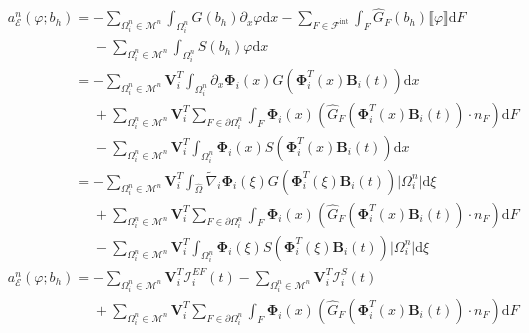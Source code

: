 \documentclass[11pt, a4paper, oneside]{report}
\begin{document}
\begin{equation}
    \begin{aligned}
        &a_\mathcal{E}^n(\varphi; b_h) = -\sum_{\Omega_i^n \in \mathcal{M}^n} \int_{\Omega_i^n} G(b_h) \partial_x \varphi \text{d}x - \sum_{F \in \mathcal{F}^\text{int}} \int_F \widehat{G}_F(b_h) \llbracket \varphi \rrbracket \text{d}F \\
        &\phantom{a_\mathcal{E}^n(\varphi; b_h) = } -\sum_{\Omega_i^n \in \mathcal{M}^n} \int_{\Omega_i^n} S(b_h) \varphi \text{d}x \\
        &\phantom{a_\mathcal{E}^n(\varphi; b_h) } = - \sum_{\Omega_i^n \in \mathcal{M}^n} \bm{V}_i^T \int_{\Omega_i^n} \partial_x \bm{\Phi}_i(x) G \left( \bm{\Phi}_i^T(x) \bm{B}_i(t) \right) \text{d}x \\
        &\phantom{a_\mathcal{E}^n(\varphi; b_h) = } + \sum_{\Omega_i^n \in \mathcal{M}^n} \bm{V}_i^T \sum_{F \in \partial \Omega_i^n} \int_F \bm{\Phi}_i(x) \left( \widehat{G}_F \left( \bm{\Phi}_i^T(x) \bm{B}_i(t) \right) \cdot n_F \right) \text{d}F \\
        &\phantom{a_\mathcal{E}^n(\varphi; b_h) = } - \sum_{\Omega_i^n \in \mathcal{M}^n} \bm{V}_i^T \int_{\Omega_i^n} \bm{\Phi}_i(x) S \left( \bm{\Phi}_i^T(x) \bm{B}_i(t) \right) \text{d}x \\
        &\phantom{a_\mathcal{E}^n(\varphi; b_h) } = - \sum_{\Omega_i^n \in \mathcal{M}^n} \bm{V}_i^T \int_{\widehat{\Omega}} \widetilde{\nabla}_i \bm{\Phi}_i(\xi) G \left( \bm{\Phi}_i^T(\xi) \bm{B}_i(t) \right) \lvert \Omega_i^n \rvert \text{d}\xi \\
        &\phantom{a_\mathcal{E}^n(\varphi; b_h) = } + \sum_{\Omega_i^n \in \mathcal{M}^n} \bm{V}_i^T \sum_{F \in \partial \Omega_i^n} \int_F \bm{\Phi}_i(x) \left( \widehat{G}_F \left( \bm{\Phi}_i^T(x) \bm{B}_i(t) \right) \cdot n_F \right) \text{d}F \\
        &\phantom{a_\mathcal{E}^n(\varphi; b_h) = } - \sum_{\Omega_i^n \in \mathcal{M}^n} \bm{V}_i^T \int_{\Omega_i^n} \bm{\Phi}_i(\xi) S \left( \bm{\Phi}_i^T(\xi) \bm{B}_i(t) \right) \lvert \Omega_i^n \rvert \text{d}\xi \\
        &a_\mathcal{E}^n(\varphi; b_h) = -\sum_{\Omega_i^n \in \mathcal{M}^n} \bm{V}_i^T \bm{\mathcal{I}}_i^{EF}(t) - \sum_{\Omega_i^n \in \mathcal{M}^n} \bm{V}_i^T \bm{\mathcal{I}}_i^S(t) \\
        &\phantom{a_\mathcal{E}^n(\varphi; b_h) = } + \sum_{\Omega_i^n \in \mathcal{M}^n} \bm{V}_i^T \sum_{F \in \partial \Omega_i^n} \int_F \bm{\Phi}_i(x) \left( \widehat{G}_F \left( \bm{\Phi}_i^T(x) \bm{B}_i(t) \right) \cdot n_F \right) \text{d}F
    \end{aligned}
\end{equation}
\end{document}

